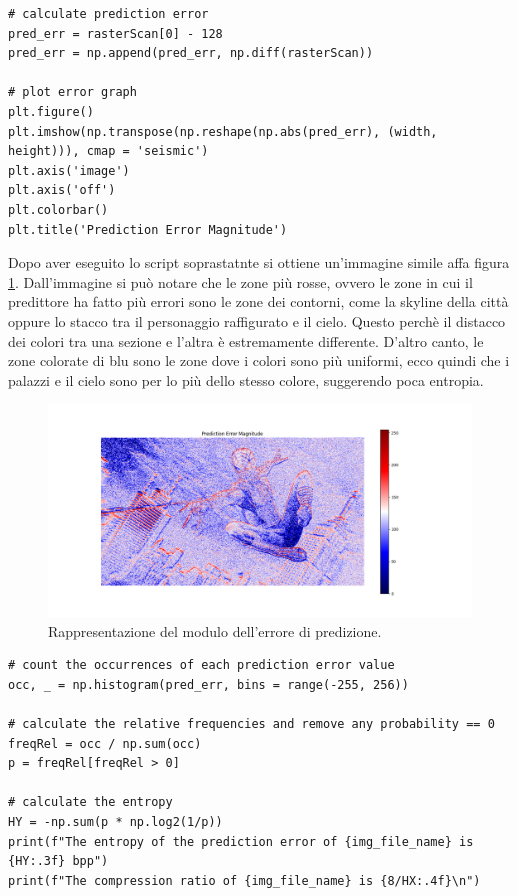 \begin{lstlisting}
# calculate prediction error
pred_err = rasterScan[0] - 128
pred_err = np.append(pred_err, np.diff(rasterScan))

# plot error graph
plt.figure()
plt.imshow(np.transpose(np.reshape(np.abs(pred_err), (width, height))), cmap = 'seismic')
plt.axis('image')
plt.axis('off')
plt.colorbar()
plt.title('Prediction Error Magnitude')
\end{lstlisting}

\noindent Dopo aver eseguito lo script soprastatnte si ottiene un'immagine simile affa figura \ref{fig:simple-coding}. Dall'immagine si può notare che le zone più rosse, ovvero le zone in cui il predittore ha fatto più errori sono le zone dei contorni, come la skyline della città oppure lo stacco tra il personaggio raffigurato e il cielo. Questo perchè il distacco dei colori tra una sezione e l'altra è estremamente differente. D'altro canto, le zone colorate di blu sono le zone dove i colori sono più uniformi, ecco quindi che i palazzi e il cielo sono per lo più dello stesso colore, suggerendo poca entropia. 

\begin{figure}[h]
    \centering
    \includegraphics[width = .9\textwidth]{hw-1/report/imgs/simple-coding.png}
    \caption{Rappresentazione del modulo dell'errore di predizione.}
    \label{fig:simple-coding}
\end{figure}

\begin{lstlisting}
# count the occurrences of each prediction error value
occ, _ = np.histogram(pred_err, bins = range(-255, 256))

# calculate the relative frequencies and remove any probability == 0
freqRel = occ / np.sum(occ)
p = freqRel[freqRel > 0]

# calculate the entropy
HY = -np.sum(p * np.log2(1/p))
print(f"The entropy of the prediction error of {img_file_name} is {HY:.3f} bpp")
print(f"The compression ratio of {img_file_name} is {8/HX:.4f}\n")
\end{lstlisting}






